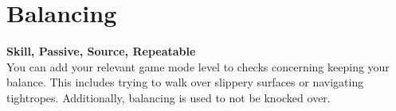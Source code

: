 \section{Balancing}\label{sec:balancing}
\textbf{Skill, Passive, Source, Repeatable}\\
You can add your relevant game mode level to checks concerning keeping your balance.
This includes trying to walk over slippery surfaces or navigating tightropes.
Additionally, balancing is used to not be knocked over.